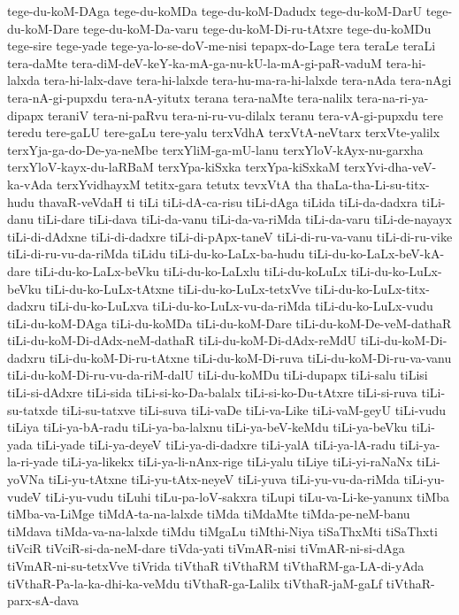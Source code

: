 {tege-du-koM-DAga
tege-du-koMDa
tege-du-koM-Dadudx
tege-du-koM-DarU
tege-du-koM-Dare
tege-du-koM-Da-varu
tege-du-koM-Di-ru-tAtxre
tege-du-koMDu
tege-sire
tege-yade
tege-ya-lo-se-doV-me-nisi
tepapx-do-Lage
tera
teraLe
teraLi
tera-daMte
tera-diM-deV-keY-ka-mA-ga-nu-kU-la-mA-gi-paR-vaduM
tera-hi-lalxda
tera-hi-lalx-dave
tera-hi-lalxde
tera-hu-ma-ra-hi-lalxde
tera-nAda
tera-nAgi
tera-nA-gi-pupxdu
tera-nA-yitutx
terana
tera-naMte
tera-nalilx
tera-na-ri-ya-dipapx
teraniV
tera-ni-paRvu
tera-ni-ru-vu-dilalx
teranu
tera-vA-gi-pupxdu
tere
teredu
tere-gaLU
tere-gaLu
tere-yalu
terxVdhA
terxVtA-neVtarx
terxVte-yalilx
terxYja-ga-do-De-ya-neMbe
terxYliM-ga-mU-lanu
terxYloV-kAyx-nu-garxha
terxYloV-kayx-du-laRBaM
terxYpa-kiSxka
terxYpa-kiSxkaM
terxYvi-dha-veV-ka-vAda
terxYvidhayxM
tetitx-gara
tetutx
tevxVtA
tha
thaLa-tha-Li-su-titx-hudu
thavaR-veVdaH
ti
tiLi
tiLi-dA-ca-risu
tiLi-dAga
tiLida
tiLi-da-dadxra
tiLi-danu
tiLi-dare
tiLi-dava
tiLi-da-vanu
tiLi-da-va-riMda
tiLi-da-varu
tiLi-de-nayayx
tiLi-di-dAdxne
tiLi-di-dadxre
tiLi-di-pApx-taneV
tiLi-di-ru-va-vanu
tiLi-di-ru-vike
tiLi-di-ru-vu-da-riMda
tiLidu
tiLi-du-ko-LaLx-ba-hudu
tiLi-du-ko-LaLx-beV-kA-dare
tiLi-du-ko-LaLx-beVku
tiLi-du-ko-LaLxlu
tiLi-du-koLuLx
tiLi-du-ko-LuLx-beVku
tiLi-du-ko-LuLx-tAtxne
tiLi-du-ko-LuLx-tetxVve
tiLi-du-ko-LuLx-titx-dadxru
tiLi-du-ko-LuLxva
tiLi-du-ko-LuLx-vu-da-riMda
tiLi-du-ko-LuLx-vudu
tiLi-du-koM-DAga
tiLi-du-koMDa
tiLi-du-koM-Dare
tiLi-du-koM-De-veM-dathaR
tiLi-du-koM-Di-dAdx-neM-dathaR
tiLi-du-koM-Di-dAdx-reMdU
tiLi-du-koM-Di-dadxru
tiLi-du-koM-Di-ru-tAtxne
tiLi-du-koM-Di-ruva
tiLi-du-koM-Di-ru-va-vanu
tiLi-du-koM-Di-ru-vu-da-riM-dalU
tiLi-du-koMDu
tiLi-dupapx
tiLi-salu
tiLisi
tiLi-si-dAdxre
tiLi-sida
tiLi-si-ko-Da-balalx
tiLi-si-ko-Du-tAtxre
tiLi-si-ruva
tiLi-su-tatxde
tiLi-su-tatxve
tiLi-suva
tiLi-vaDe
tiLi-va-Like
tiLi-vaM-geyU
tiLi-vudu
tiLiya
tiLi-ya-bA-radu
tiLi-ya-ba-lalxnu
tiLi-ya-beV-keMdu
tiLi-ya-beVku
tiLi-yada
tiLi-yade
tiLi-ya-deyeV
tiLi-ya-di-dadxre
tiLi-yalA
tiLi-ya-lA-radu
tiLi-ya-la-ri-yade
tiLi-ya-likekx
tiLi-ya-li-nAnx-rige
tiLi-yalu
tiLiye
tiLi-yi-raNaNx
tiLi-yoVNa
tiLi-yu-tAtxne
tiLi-yu-tAtx-neyeV
tiLi-yuva
tiLi-yu-vu-da-riMda
tiLi-yu-vudeV
tiLi-yu-vudu
tiLuhi
tiLu-pa-loV-sakxra
tiLupi
tiLu-va-Li-ke-yanunx
tiMba
tiMba-va-LiMge
tiMdA-ta-na-lalxde
tiMda
tiMdaMte
tiMda-pe-neM-banu
tiMdava
tiMda-va-na-lalxde
tiMdu
tiMgaLu
tiMthi-Niya
tiSaThxMti
tiSaThxti
tiVciR
tiVciR-si-da-neM-dare
tiVda-yati
tiVmAR-nisi
tiVmAR-ni-si-dAga
tiVmAR-ni-su-tetxVve
tiVrida
tiVthaR
tiVthaRM
tiVthaRM-ga-LA-di-yAda
tiVthaR-Pa-la-ka-dhi-ka-veMdu
tiVthaR-ga-Lalilx
tiVthaR-jaM-gaLf
tiVthaR-parx-sA-dava
}
